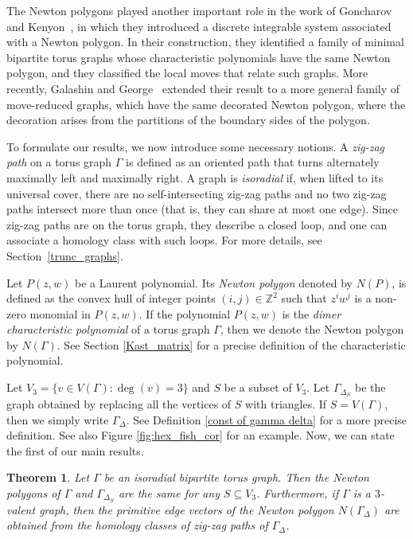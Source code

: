 \documentclass[12pt,a4paper]{article}
\newtheorem{thm}{Theorem}
\theoremstyle{definition}
\begin{document}
The Newton polygons played another important role in the work of Goncharov and Kenyon~\cite{GoncharovKenyon}, in which they introduced a discrete integrable system associated with a Newton polygon. In their construction, they identified a family of minimal bipartite torus graphs whose characteristic polynomials have the same Newton polygon, and they classified the local moves that relate such graphs. More recently, Galashin and George~\cite{GalashinGeorge} extended their result to a more general family of move-reduced graphs, which have the same decorated Newton polygon, where the decoration arises from the partitions of the boundary sides of the polygon.

To formulate our results, we now introduce some necessary notions. A \emph{zig-zag path} on a torus graph $\Gamma$ is defined as an oriented path that turns alternately maximally left and maximally right. A graph is \emph{isoradial} if, when lifted to its universal cover, there are no self-intersecting zig-zag paths and no two zig-zag paths intersect more than once (that is, they can share at most one edge). Since zig-zag paths are on the torus graph, they describe a closed loop, and one can associate a homology class with such loops. For more details, see Section~\ref{trunc_graphs}. 

Let $P(z,w)$ be a Laurent polynomial. Its \emph{Newton polygon} denoted by $N(P)$, is defined as the convex hull of integer points $(i,j) \in \mathbb{Z}^2$ such that $z^i w^j$ is a non-zero monomial in $P(z,w)$. If the polynomial $P(z,w)$ is the \emph{dimer characteristic polynomial} of a torus graph $\Gamma$, then we denote the Newton polygon by $N(\Gamma)$. See Section \ref{Kast_matrix} for a precise definition of the characteristic polynomial.

Let $V_3 = \{v \in V(\Gamma): \deg(v) = 3\}$ and $S$ be a subset of $V_3$. Let $\Gamma_{\Delta_{S}}$ be the graph obtained by replacing all the vertices of $S$ with triangles. If $S = V(\Gamma)$, then we simply write $\Gamma_\Delta$. See Definition \ref{const of gamma delta} for a more precise definition. See also Figure \ref{fig:hex_fish_cor} for an example. Now, we can state the first of our main results.

\begin{thm}
    Let $\Gamma$ be an isoradial bipartite torus graph. Then the Newton polygons of $\Gamma$ and $\Gamma_{\Delta_{S}}$ are the same for any $S \subseteq V_3$. Furthermore, if $\Gamma$ is a $3$-valent graph, then the primitive edge vectors of the Newton polygon $N(\Gamma_\Delta)$ are obtained from the homology classes of zig-zag paths of $\Gamma_{\Delta}$.
\end{thm}
\end{document}
